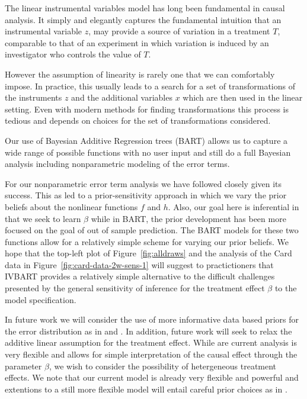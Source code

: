 
The linear instrumental variables model has long been fundamental in causal analysis.
It simply and elegantly captures the fundamental intuition
that an instrumental variable $z$, may provide
a source of variation in a treatment $T$, comparable to that of an experiment
in which
variation is induced by an investigator who
controls the value of $T$. 

However the assumption of linearity is rarely one that we can  comfortably impose.
In practice, this usually leads to a search for a set of transformations of the instruments
$z$ and the additional variables $x$ which are then used in the linear setting.
Even with modern methods for finding transformations this process is tedious and depends on
choices for the set of transformations considered.

Our use of Bayesian Additive Regression trees (BART) allows us to capture a wide
range of possible functions with no user input and still do a full Bayesian analysis including nonparametric
modeling of the error terms.

For our nonparametric error term analysis we have followed \cite{CHMR08} closely given its success.
This as led to a prior-sensitivity approach in which we vary the prior beliefs about the nonlinear functions $f$ and $h$.
Also, our goal here is inferential in that we seek to learn $\beta$ while in BART, the prior development has been
more focused on the goal of out of sample prediction.
The BART models for these two functions allow for a relatively simple scheme for varying our prior beliefs.
We hope that the top-left plot of Figure~\ref{fig:alldraws} and the analysis of the Card data in Figure~\ref{fig:card-data-2w-sens-1}
will suggest to practictioners that IVBART provides a relatively simple alternative to the difficult challenges presented
by the general sensitivity of inference for the treatment effect $\beta$ to the model specification.

In future work we will consider the use of more informative data based priors for the error distribution 
as in \citep{ChipGeor10} and \citep{DPMBART}.
In addition, future work will seek to relax the additive linear assumption for the treatment effect.
While are current analysis is very flexible and allows for simple interpretation of the causal effect through
the parameter $\beta$, we wish to consider the possibility of hetergeneous treatment effects.
We note that our current model is already very flexible and powerful and extentions to a still more flexible model
will entail careful prior choices as in \citep{BCF}.

